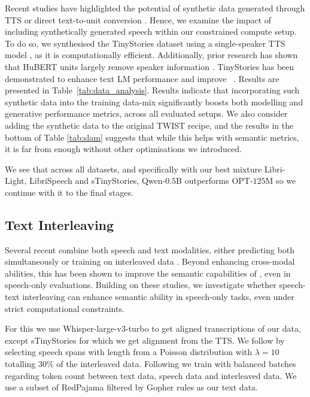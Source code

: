  Recent studies have highlighted the potential of synthetic data generated through \ac{TTS} \citep{cuervo2024scaling} or direct text-to-unit conversion \citep{scaling_interleaving}. Hence, we examine the impact of including synthetically generated speech within our constrained compute setup. To do so, we synthesised the TinyStories dataset \citep{tinystories} using a single-speaker \ac{TTS} model \citep{wang2021fairseq}, as it is computationally efficient. Additionally, prior research has shown that HuBERT units largely remove speaker information \citep{maimon2023dissc}. TinyStories has been demonstrated to enhance text \ac{LM} performance and improve \slms~\citep{cuervo2024scaling}. Results are presented in Table~\ref{tab:data_analysis}. Results indicate that incorporating such synthetic data into the training data-mix significantly boosts both modelling and generative performance metrics, across all evaluated setups. We also consider adding the synthetic data to the original TWIST recipe, and the results in the bottom of Table \ref{tab:slam} suggests that while this helps with semantic metrics, it is far from enough without other optimisations we introduced.

We see that across all datasets, and specifically with our best mixture Libri-Light, LibriSpeech and sTinyStories, Qwen-$0.5$B outperforms OPT-$125$M so we continue with it to the final stages.


\subsection{Text Interleaving} 
Several recent \slms combine both speech and text modalities, either predicting both simultaneously \citep{defossez2024moshi, fang2024llama, xie2024mini} or training on interleaved data \citep{spiritlm, scaling_interleaving}. Beyond enhancing cross-modal abilities, this has been shown to improve the semantic capabilities of \slms, even in speech-only evaluations. Building on these studies, we investigate whether speech-text interleaving can enhance semantic ability in speech-only tasks, even under strict computational constraints.

For this we use Whisper-large-v3-turbo to get aligned transcriptions of our data, except sTinyStories for which we get alignment from the \ac{TTS}. We follow \citet{scaling_interleaving} by selecting speech spans with length from a Poisson distribution with $\lambda=10$ totalling $30\%$ of the interleaved data. Following \citet{spiritlm} we train with balanced batches regarding token count between text data, speech data and interleaved data. We use a subset of RedPajama \citep{weber2024redpajama} filtered by Gopher \citep{rae2021scaling} rules as our text data.

